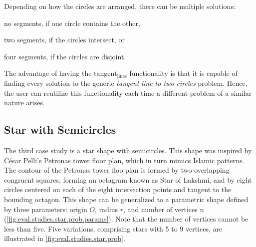 Depending on how the circles are arranged, there can be multiple solutions:
\begin{enumerate*}[label= (\arabic*)]
  \item no segments, if one circle contains the other,
  \item two segments, if the circles intersect, or
  \item four segments, if the circles are disjoint.
\end{enumerate*}
The advantage of having the $\mathrm{tangent_{lines}}$ functionality is that it
is capable of finding every solution to the generic \textit{tangent line to two
circles} problem.  Hence, the user can reutilize this functionality each time
a different problem of a similar nature arises.

\subsection{Star with Semicircles}%
\label{sec:eval.studies.star}

The third case study is a star shape with semicircles.  This shape was inspired
by César Pelli's Petronas tower floor plan, which in turn mimics Islamic
patterns.  The contour of the Petronas tower floo plan is formed by two
overlapping congruent squares, forming an octagram known as Star of Lakshmi, and
by eight circles centered on each of the eight intersection points and tangent
to the bounding octagon.  This shape can be generalized to a parametric shape
defined by three parameters: origin $O$, radius $r$, and number of vertices $n$
(\cref{fig:eval.studies.star.prob.params}).  Note that the number of vertices
cannot be less than five.  Five variations, comprising stars with 5 to 9
vertices, are illustrated in \cref{fig:eval.studies.star.prob}.

